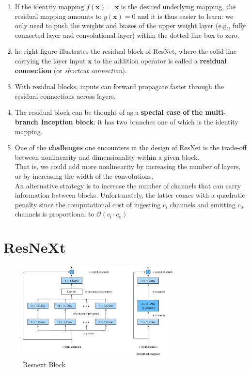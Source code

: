 \begin{enumerate}
    \item If the identity mapping $f(\mathbf{x}) = \mathbf{x}$ is the desired underlying mapping, the residual mapping amounts to $g(\mathbf{x}) = 0$ and it is thus easier to learn: we only need to push the weights and biases of the upper weight layer (e.g., fully connected layer and convolutional layer) within the dotted-line box to zero.

    \item he right figure illustrates the residual block of ResNet, where the solid line carrying the layer input $\mathbf{x}$ to the addition operator is called a \textbf{residual connection} (or \textit{shortcut connection}). 
    
    \item With residual blocks, inputs can forward propagate faster through the residual connections across layers. 
    
    \item The residual block can be thought of as a \textbf{special case of the multi-branch Inception block}: it has two branches one of which is the identity mapping.

    \item One of the \textbf{challenges} one encounters in the design of ResNet is the trade-off between nonlinearity and dimensionality within a given block.\\
    That is, we could add more nonlinearity by increasing the number of layers, or by increasing the width of the convolutions.\\
    An alternative strategy is to increase the number of channels that can carry information between blocks. Unfortunately, the latter comes with a quadratic penalty since the computational cost of ingesting $c_i$ channels and emitting $c_o$ channels is proportional to $\mathcal{O}(c_\textrm{i} \cdot c_\textrm{o})$
\end{enumerate}






\section{ResNeXt \cite{dnn-1}} \label{ResNeXt}

\begin{figure}[H]
    \centering
    \includegraphics[width=\linewidth, height=5cm, keepaspectratio]{Pictures/convolutional-neural-network/resnext-block.jpg}
    \caption{Resnext Block}
\end{figure}


